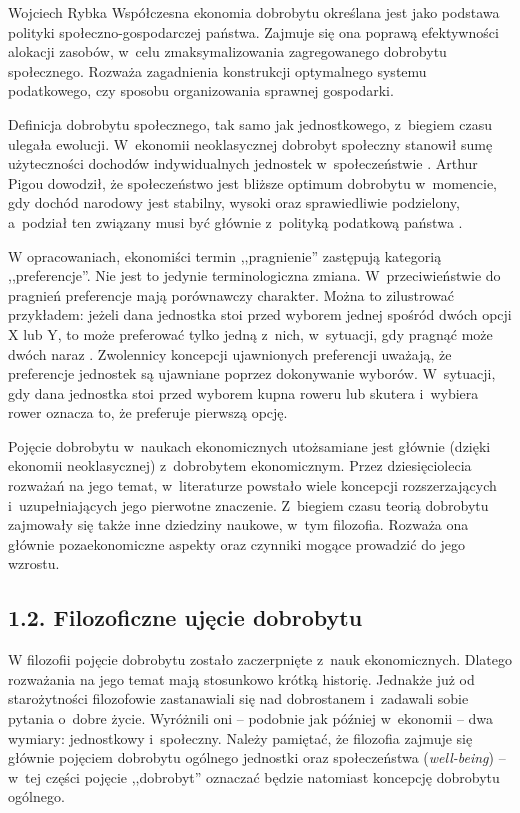 \begin{artplenv}{Wojciech Rybka}
Współczesna ekonomia dobrobytu określana jest jako podstawa polityki społeczno-gospodarczej państwa. Zajmuje się ona
poprawą efektywności alokacji zasobów, w~celu zmaksymalizowania zagregowanego dobrobytu społecznego. Rozważa
zagadnienia konstrukcji optymalnego systemu podatkowego, czy sposobu organizowania sprawnej gospodarki.

Definicja dobrobytu społecznego, tak samo jak jednostkowego, z~biegiem czasu ulegała ewolucji. W~ekonomii neoklasycznej
dobrobyt społeczny stanowił sumę użyteczności dochodów indywidualnych jednostek w~społeczeństwie
\parencite{zaremba_dobrobyt_2016}.
Arthur Pigou dowodził, że społeczeństwo jest bliższe optimum
dobrobytu w~momencie, gdy dochód narodowy jest stabilny, wysoki oraz sprawiedliwie podzielony, a~podział ten związany musi być
głównie z~polityką podatkową państwa
\parencite{zaremba_dobrobyt_2016}.

W opracowaniach, ekonomiści termin ,,pragnienie'' zastępują kategorią ,,preferencje''. Nie jest to jedynie terminologiczna
zmiana. W~przeciwieństwie do pragnień preferencje mają porównawczy charakter. Można to zilustrować przykładem: jeżeli
dana jednostka stoi przed wyborem jednej spośród dwóch opcji X lub Y, to może preferować tylko jedną z~nich,
w~sytuacji, gdy pragnąć może dwóch naraz
\parencite{kwarcinski_koncepcje_2016}.
Zwolennicy koncepcji ujawnionych
preferencji uważają, że preferencje jednostek są ujawniane poprzez dokonywanie wyborów. W~sytuacji, gdy dana jednostka
stoi przed wyborem kupna roweru lub skutera i~wybiera rower oznacza to, że preferuje pierwszą opcję. 

Pojęcie dobrobytu w~naukach ekonomicznych utożsamiane jest głównie (dzięki ekonomii neoklasycznej) z~dobrobytem
ekonomicznym. Przez dziesięciolecia rozważań na jego temat, w~literaturze powstało wiele koncepcji
rozszerzających i~uzupełniających jego pierwotne znaczenie. Z~biegiem czasu teorią dobrobytu
zajmowały się także inne dziedziny naukowe, w~tym filozofia. Rozważa ona głównie pozaekonomiczne
aspekty oraz czynniki mogące prowadzić do jego wzrostu. 

\subsection{1.2. Filozoficzne ujęcie dobrobytu}
W filozofii pojęcie dobrobytu zostało zaczerpnięte z~nauk ekonomicznych. Dlatego rozważania na jego temat mają
stosunkowo krótką historię. Jednakże już od starożytności filozofowie zastanawiali się nad dobrostanem i~zadawali sobie
pytania o~dobre życie. Wyróżnili oni -- podobnie jak później w~ekonomii -- dwa wymiary: jednostkowy i~społeczny. Należy
pamiętać, że filozofia zajmuje się głównie pojęciem dobrobytu ogólnego jednostki oraz społeczeństwa
(\textit{well-being}) -- w~tej części pojęcie ,,dobrobyt'' oznaczać będzie natomiast koncepcję dobrobytu ogólnego. 


\end{artplenv}
